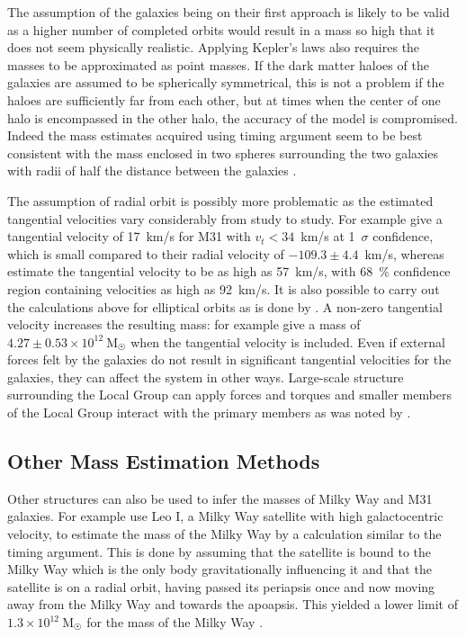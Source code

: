 \documentclass[english, twoside]{HYgradu}
\begin{document}
The assumption of the galaxies being on their first approach is likely to be valid as a higher number of completed orbits would result in a mass so high that it does not seem physically realistic. Applying Kepler's laws also requires the masses to be approximated as point masses.  If the dark matter haloes of the galaxies are assumed to be spherically symmetrical, this is not a problem if the haloes are sufficiently far from each other, but at times when the center of one halo is encompassed in the other halo, the accuracy of the model is compromised. Indeed the mass estimates acquired using timing argument seem to be best consistent with the mass enclosed in two spheres surrounding the two galaxies with radii of half the distance between the galaxies \citep{kroeker1991accuracy}. 

The assumption of radial orbit is possibly more problematic as the estimated tangential velocities vary considerably from study to study. For example \citet{vandermarel2012m31} give a tangential velocity of 17~km/s for M31 with $v_{t} < 34$~km/s at 1~$\sigma$ confidence, which is small compared to their radial velocity of $-109.3 \pm 4.4$~km/s, whereas \citet{vandermarel2018first} estimate the tangential velocity to be as high as 57~km/s, with 68~\% confidence region containing velocities as high as 92~km/s. It is also possible to carry out the calculations above for elliptical orbits as is done by \citet{einasto1982mass}. A non-zero tangential velocity increases the resulting mass: for example \citet{vandermarel2012m31} give a mass of $4.27 \pm 0.53 \times 10^{12}~\mathrm{M_{\astrosun}}$ when the tangential velocity is included. Even if external forces felt by the galaxies do not result in significant tangential velocities for the galaxies, they can affect the system in other ways. Large-scale structure surrounding the Local Group can apply forces and torques and smaller members of the Local Group interact with the primary members as was noted by \citet{kahn1959intergalactic}.


\subsection{Other Mass Estimation Methods} \label{sect:other_mass_estimation}

Other structures can also be used to infer the masses of Milky Way and M31 galaxies. For example \citet{zaritsky1989velocities} use Leo I, a Milky Way satellite with high galactocentric velocity, to estimate the mass of the Milky Way by a calculation similar to the timing argument. This is done by assuming that the satellite is bound to the Milky Way which is the only body gravitationally influencing it and that the satellite is on a radial orbit, having passed its periapsis once and now moving away from the Milky Way and towards the apoapsis. This yielded a lower limit of $1.3 \times 10^{12}~\mathrm{M_{\astrosun}}$ for the mass of the Milky Way \citep{zaritsky1989velocities}.
\end{document}
